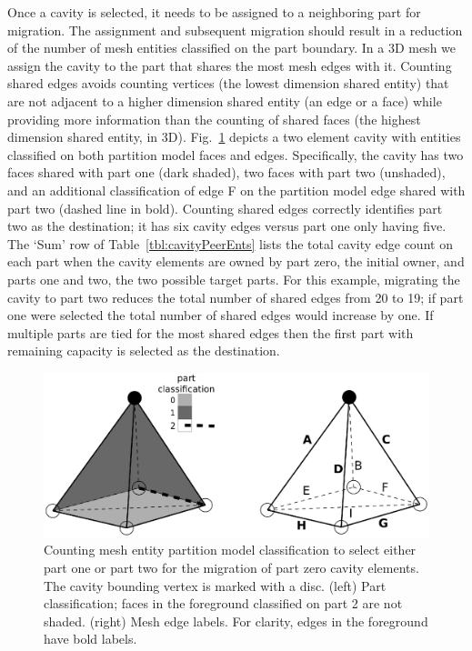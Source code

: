 Once a cavity is selected, it needs to be assigned to a neighboring part for
migration.
The assignment and subsequent migration should result in a reduction of the
number of mesh entities classified on the part boundary.
In a 3D mesh we assign the cavity to the part that shares the most mesh edges
with it.
Counting shared edges avoids counting vertices (the lowest dimension shared entity)
that are not adjacent to a higher dimension shared entity (an edge or a face) while
providing more information than the counting of shared faces (the highest
dimension shared entity, in 3D).
Fig.~\ref{fig:cavityPeers} depicts a two element cavity with entities
classified on both partition model faces and edges.
Specifically, the cavity has two faces shared with part one (dark shaded), two
faces with part two (unshaded),
and an additional classification of edge F on the partition model
edge shared with part two (dashed line in bold).
Counting shared edges correctly identifies part two as the destination;
it has six cavity edges versus part one only having five.
The `Sum' row of Table~\ref{tbl:cavityPeerEnts} lists the total cavity edge
count on each part when the cavity elements are owned by part zero, the initial
owner, and parts one and two, the two possible target parts.
For this example, migrating the cavity to part two reduces the total number of
shared edges from 20 to 19; if part one were selected the total number of shared
edges would increase by one.
If multiple parts are tied for the most shared edges then the first part with
remaining capacity is selected as the destination.

\begin{figure} \centering
\includegraphics[width=.8\textwidth]{figs/cavityPeers/cavityPeers-shaded.eps}
\caption[Counting mesh entity partition model classification to select a destination
         part for the cavity elements.] {
    Counting mesh entity partition model classification to select either part
    one or part two for the migration of part zero cavity elements.
    The cavity bounding vertex is marked with a disc.
    (left) Part classification; faces in the foreground
    classified on part 2 are not shaded.
    (right) Mesh edge labels. For clarity, edges in the
    foreground have bold labels.
}
\label{fig:cavityPeers}
\end{figure}

